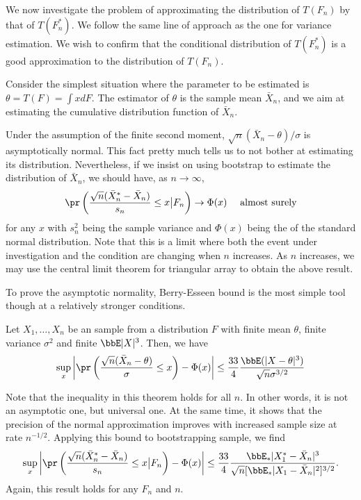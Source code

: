 We now investigate the problem of approximating the distribution of $T(F_n)$ 
by that of $T(F_n^*)$.
We follow the same line of approach as the one for variance estimation.
We wish to confirm that the conditional distribution of $T(F_n^*)$ is a 
good approximation to the distribution of $T(F_n)$.

Consider the simplest situation where the parameter to
be estimated is $\theta = T(F) = \int x dF$.
The estimator of $\theta$ is the sample mean $\bar X_n$, 
and we aim at estimating
the cumulative distribution function of $\bar X_n$.

Under the assumption of the finite second moment,
$\sqrt{n}(\bar X_n - \theta)/\sigma$ is asymptotically normal.
This fact pretty much tells us to not bother at estimating
its distribution. 
Nevertheless, if we insist on using bootstrap to
estimate the distribution of $\bar X_n$,
we should have, as $n \rightarrow \infty$,
\[
\pr 
\left ( 
\frac{\sqrt{n} (\bar X_n^* - \bar X_n) }{s_n} \leq x \big | 
F_n
\right ) 
\rightarrow 
\Phi(x) ~~~~\mbox{almost surely}
\]
for any $x$ with $s_n^2$ being the sample variance
and $\Phi(x)$ being the \cdf of the standard normal distribution.
Note that this is a limit where both the event under investigation and
the condition are changing when $n$ increases.
As $n$ increases, we may use the central limit theorem for triangular
array to obtain the above result.

To prove the asymptotic normality, Berry-Esseen bound
is the most simple tool though at a relatively stronger conditions.

\begin{theorem}
Let $X_1, \ldots, X_n$ be an \iid sample from a distribution $F$
with finite mean $\theta$, finite variance $\sigma^2$
and finite $\bbE |X|^3$. Then, we have
\[
\sup_x \left  |
\pr 
\left (
\frac{\sqrt{n} (\bar X_n - \theta) }{\sigma}  \leq x
\right ) 
-
\Phi(x) 
\right |
\leq
\frac{33}{4} \frac{\bbE (|X - \theta|^3)}{\sqrt{n} \sigma^{3/2}}
\]
\end{theorem}

Note that the inequality in this theorem holds for all $n$. 
In other words, it is
not an asymptotic one, but universal one. At the same time, it
shows that the precision of the normal approximation improves
with increased sample size at rate $n^{-1/2}$.
Applying this bound to bootstrapping sample, we find
\[
\sup_x \left |
\pr \left ( \frac{\sqrt{n} (\bar X_n^* - \bar X_n)}{s_n} \leq x \big | 
F_n \right ) 
-
\Phi(x) \right | 
\leq 
\frac{33}{4}
\frac{\bbE_*|X_1^* - \bar X_n|^3}
{\sqrt{n} [\bbE_*|X_1 - \bar X_n|^2]^{3/2}}.
\]
Again, this result holds for any $F_n$ and $n$.


